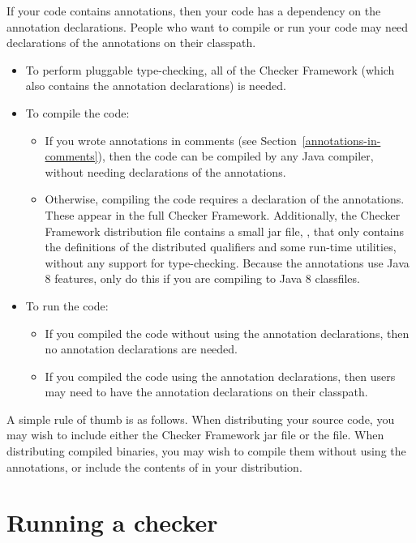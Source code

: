 If your code contains annotations, then your code has a dependency on the
annotation declarations.  People who want to compile or run your code may
need declarations of the annotations on their classpath.

\begin{itemize}
\item
To perform pluggable type-checking, all of the Checker Framework (which
also contains the annotation declarations) is needed.
\item
To compile the code:
\begin{itemize}
\item
  If you wrote annotations in comments (see
  Section~\ref{annotations-in-comments}), then the code
  can be compiled by any Java compiler, without needing declarations of the
  annotations.
\item
  Otherwise, compiling the code requires a declaration of the annotations.
  These appear in the full Checker Framework.  Additionally, the Checker
  Framework distribution  file contains a small jar file,
  , that only contains the definitions of the
  distributed qualifiers and some run-time utilities, without any support
  for type-checking.  Because the annotations use Java 8 features, only do
  this if you are compiling to Java 8 classfiles.
\end{itemize}
\item
To run the code:
\begin{itemize}
\item
  If you compiled the code without using the annotation declarations, then
  no annotation declarations are needed.
\item
  If you compiled the code using the annotation declarations, then users
  may need to have the annotation declarations on their classpath.
\end{itemize}
\end{itemize}

A simple rule of thumb is as follows.  When distributing your source code,
you may wish to include either the Checker Framework jar file or the
 file.  When distributing compiled binaries, you
may wish to compile them without using the annotations, or include the
contents of  in your distribution.


\section{Running a checker\label{running}}

